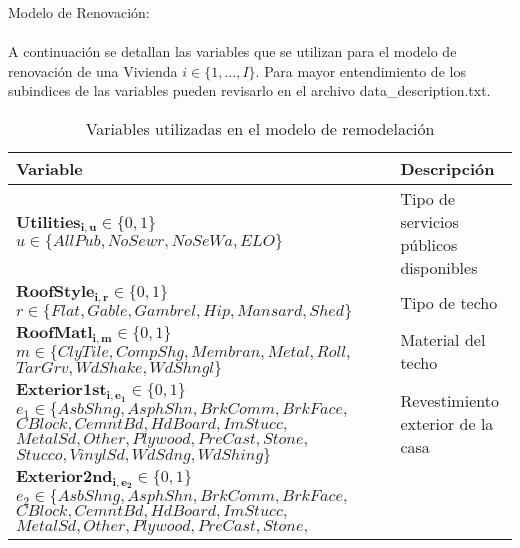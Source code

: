 Modelo de Renovación:\\\\
A continuación se detallan las variables que se utilizan para el modelo de renovación de una Vivienda $i \in \{1, ..., I\}.$ Para mayor entendimiento de los subindices de las variables pueden revisarlo en el archivo data\_description.txt. 
\begin{longtable}{ | p{8cm} | p{5cm} | }
    \caption{Variables utilizadas en el modelo de remodelación} \label{tab:variables remodelación} \\
    \hline
    \textbf{Variable} & \textbf{Descripción}\\
    \hline
    $\boldsymbol{Utilities_{i,u}} \in \{0, 1\}$ \newline 
    $u \in \{AllPub, NoSewr, NoSeWa, ELO\}$ & Tipo de servicios públicos disponibles\\
    \hline
    $\boldsymbol{RoofStyle_{i,r}} \in \{0, 1\}$\newline 
    $r \in \{Flat, Gable, Gambrel, Hip, Mansard, Shed\}$ & Tipo de techo\\
    \hline
    $\boldsymbol{RoofMatl_{i,m}} \in \{0, 1\}$\newline 
    $m \in \{ClyTile, CompShg, Membran, Metal, Roll,$ \newline \hspace{1cm}$TarGrv, WdShake, WdShngl\}$ & Material del techo\\
    \hline
    $\boldsymbol{Exterior1st_{i,e_1}} \in \{0, 1\}$\newline 
    $e_{1} \in \{AsbShng, AsphShn, BrkComm, BrkFace,$\newline 
    \hspace{1cm} $CBlock, CemntBd, HdBoard, ImStucc,$\newline 
    \hspace{1cm} $MetalSd, Other, Plywood, PreCast, Stone,$\newline 
    \hspace{1cm}$Stucco, VinylSd, WdSdng, WdShing\}$ & Revestimiento exterior de la casa\\
    \hline
    $\boldsymbol{Exterior2nd_{i,e_2}} \in \{0, 1\}$\newline 
    $e_{2} \in \{AsbShng, AsphShn, BrkComm, BrkFace,$\newline 
    \hspace{1cm} $CBlock, CemntBd, HdBoard, ImStucc,$\newline 
    \hspace{1cm} $MetalSd, Other, Plywood, PreCast, Stone,$\newline 

\end{longtable}
